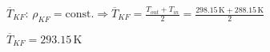 \( \overline{T}_{KF} \):  
\( \rho_{KF} = \text{const.} \Rightarrow \overline{T}_{KF} = \frac{T_{out} + T_{in}}{2} = \frac{298.15 \, \text{K} + 288.15 \, \text{K}}{2} \)  

\(\overline{T}_{KF} = 293.15 \, \text{K} \)